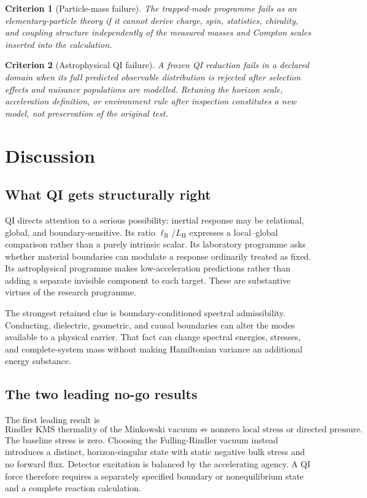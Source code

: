 \documentclass[11pt]{article}
\newtheorem{criterion}{Criterion}
\newcommand{\ellR}{\ell_{\mathrm{R}}}
\newcommand{\LH}{L_{\mathrm{H}}}
\begin{document}
\begin{criterion}[Particle-mass failure]
The trapped-mode programme fails as an elementary-particle theory if it cannot derive charge, spin, statistics, chirality, and coupling structure independently of the measured masses and Compton scales inserted into the calculation.
\end{criterion}

\begin{criterion}[Astrophysical QI failure]
A frozen QI reduction fails in a declared domain when its full predicted observable distribution is rejected after selection effects and nuisance populations are modelled. Retuning the horizon scale, acceleration definition, or environment rule after inspection constitutes a new model, not preservation of the original test.
\end{criterion}

\section{Discussion}
\label{sec:discussion}

\subsection{What QI gets structurally right}

QI directs attention to a serious possibility: inertial response may be relational, global, and boundary-sensitive. Its ratio \(\ellR/\LH\) expresses a local--global comparison rather than a purely intrinsic scalar. Its laboratory programme asks whether material boundaries can modulate a response ordinarily treated as fixed. Its astrophysical programme makes low-acceleration predictions rather than adding a separate invisible component to each target. These are substantive virtues of the research programme.

The strongest retained clue is boundary-conditioned spectral admissibility. Conducting, dielectric, geometric, and causal boundaries can alter the modes available to a physical carrier. That fact can change spectral energies, stresses, and complete-system mass without making Hamiltonian variance an additional energy substance.

\subsection{The two leading no-go results}

The first leading result is
\begin{equation}
    \text{Rindler KMS thermality of the Minkowski vacuum}
    \not\Rightarrow
    \text{nonzero local stress or directed pressure}.
\end{equation}
The baseline stress is zero. Choosing the Fulling-Rindler vacuum instead introduces a distinct, horizon-singular state with static negative bulk stress and no forward flux. Detector excitation is balanced by the accelerating agency. A QI force therefore requires a separately specified boundary or nonequilibrium state and a complete reaction calculation.
\end{document}
